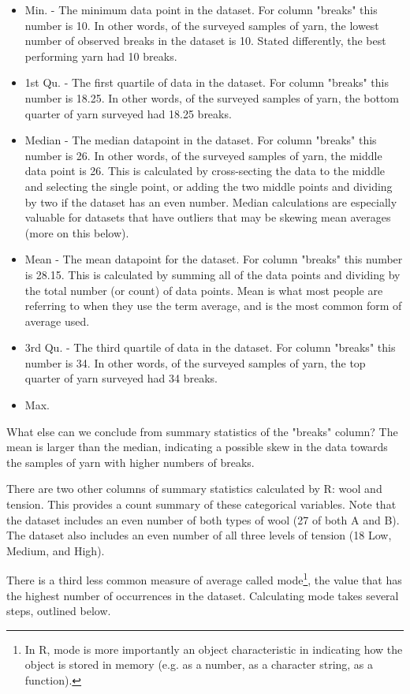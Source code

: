 \begin{itemize}
 \item Min. - The minimum data point in the dataset. For column "breaks" this number is 10. In other words, of the surveyed samples of yarn, the lowest number of observed breaks in the dataset is 10. Stated differently, the best performing yarn had 10 breaks.
 \item 1st Qu. - The first quartile of data in the dataset. For column "breaks" this number is 18.25. In other words, of the surveyed samples of yarn, the bottom quarter of yarn surveyed had 18.25 breaks.
 \item Median - The median datapoint in the dataset. For column "breaks" this number is 26. In other words, of the surveyed samples of yarn, the middle data point is 26. This is calculated by cross-secting the data to the middle and selecting the single point, or adding the two middle points and dividing by two if the dataset has an even number. Median calculations are especially valuable for datasets that have outliers that may be skewing mean averages (more on this below).
 \item Mean - The mean datapoint for the dataset. For column "breaks" this number is 28.15. This is calculated by summing all of the data points and dividing by the total number (or count) of data points. Mean is what most people are referring to when they use the term average, and is the most common form of average used.
 \item 3rd Qu. - The third quartile of data in the dataset. For column "breaks" this number is 34. In other words, of the surveyed samples of yarn, the top quarter of yarn surveyed had 34 breaks.
 \item Max.
\end{itemize}

What else can we conclude from summary statistics of the "breaks" column? The mean is larger than the median, indicating a possible skew in the data towards the samples of yarn with higher numbers of breaks.

There are two other columns of summary statistics calculated by R: wool and tension. This provides a count summary of these categorical variables. Note that the dataset includes an even number of both types of wool (27 of both A and B). The dataset also includes an even number of all three levels of tension (18 Low, Medium, and High).

There is a third less common measure of average called mode\footnote{In R, mode is more importantly an object characteristic in indicating how the object is stored in memory (e.g. as a number, as a character string, as a function).}, the value that has the highest number of occurrences in the dataset. Calculating mode takes several steps, outlined below.

